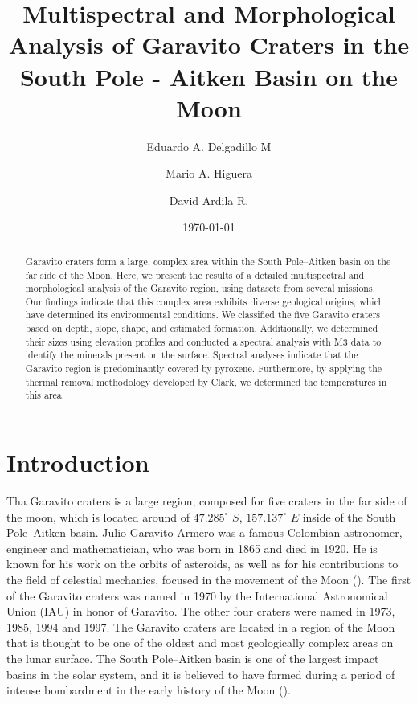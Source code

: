 \documentclass[aps,prd,nofootinbib,superscriptaddress,floatfix,longbibliography,author-year]{revtex4-2}
\begin{document}
\title{Multispectral and Morphological Analysis of Garavito Craters in the South Pole - Aitken Basin on the Moon}

\author{Eduardo A. Delgadillo M}
\author{Mario A. Higuera}

\author{David Ardila R.}

\date{\today}

\begin{abstract}
Garavito craters form a large, complex area within the South Pole–Aitken basin on the far side of the Moon. Here, we present the results of a detailed multispectral and morphological analysis of the Garavito region, using datasets from several missions. Our findings indicate that this complex area exhibits diverse geological origins, which have determined its environmental conditions.
We classified the five Garavito craters based on depth, slope, shape, and estimated formation. Additionally, we determined their sizes using elevation profiles and conducted a spectral analysis with M3 data to identify the minerals present on the surface. Spectral analyses indicate that the Garavito region is predominantly covered by pyroxene. Furthermore, by applying the thermal removal methodology developed by Clark, we determined the temperatures in this area.
\end{abstract}

\maketitle

\section{Introduction}
Tha Garavito craters is a large region, composed for five craters in  the far side of the moon, which is located around of $47.285^\circ$ $S$, $157.137^\circ$ $E$ inside of the South Pole–Aitken basin. Julio Garavito Armero was a famous Colombian astronomer, engineer and mathematician, who was born in 1865 and died in 1920. He is known for his work on the orbits of asteroids, as well as for his contributions to the field of celestial mechanics, focused in the movement of the Moon (\citet{Sanchez2025}). The first of the Garavito craters was named in 1970 by the International Astronomical Union (IAU) in honor of Garavito. The other four craters were named in 1973, 1985, 1994 and 1997. The Garavito craters are located in a region of the Moon that is thought to be one of the oldest and most geologically complex areas on the lunar surface. The South Pole–Aitken basin is one of the largest impact basins in the solar system, and it is believed to have formed during a period of intense bombardment in the early history of the Moon (\citet{JAUMANN201215}).
\end{document}
